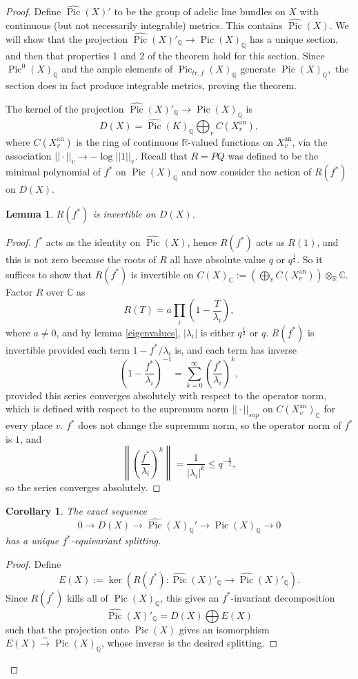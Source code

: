 \documentclass[times, doublespace]{amsart}
\numberwithin{equation}{section}
\theoremstyle{plain}
\newtheorem{lemma}[equation]{Lemma}
\newtheorem{cor}[equation]{Corollary}
\theoremstyle{definition}
\DeclareMathOperator{\Pic}{Pic}
\DeclareMathOperator{\an}{an}
\newcommand{\isom}{\xrightarrow{~\sim~}}
\newcommand{\C}{\mathbb{C}}
\newcommand{\R}{\mathbb{R}}
\newcommand{\Q}{\mathbb{Q}}
\begin{document}
\begin{proof}
Define $\widehat{\Pic}(X)'$ to  be the group of adelic line bundles on $X$ with continuous (but not necessarily integrable) metrics. This contains $\widehat{\Pic}(X)$. We will show that the projection $\widehat{\Pic}(X)'_{\Q}\to\Pic(X)_{\Q}$ has a unique section, and then that properties 1 and 2 of the theorem hold for this section. Since $\Pic^0(X)_{\Q}$ and the ample elements of $\Pic_{tr,f}(X)_{\Q}$ generate $\Pic(X)_{\Q},$ the section does in fact produce integrable metrics, proving the theorem.

The kernel of the projection $\widehat{\Pic}(X)'_{\Q}\to\Pic(X)_{\Q}$ is 
\[ D(X)=\widehat{\Pic}(K)_{\Q}\bigoplus_vC(X_v^{\an}),\]
where $C(X_v^{\an})$ is the ring of continuous $\R$-valued functions on $X_v^{\an}$, via the association $||\cdot||_v\to-\log ||1||_v$. Recall that $R=PQ$ was defined to be the minimal polynomial of $f^*$ on $\Pic(X)_{\Q}$ and now consider the action of $R(f^*)$ on $D(X)$.

\begin{lemma}
$R(f^*)$ is invertible on $D(X)$.
\end{lemma}
\begin{proof}
$f^*$ acts as the identity on $\widehat{\Pic}(X)$, hence $R(f^*)$ acts as $R(1)$, and this is not zero because the roots of $R$ all have absolute value $q$ or $q^{\frac12}$.
So it suffices to show that $R(f^*)$ is invertible on $C(X)_{\C}:=\left(\bigoplus_vC(X_v^{\an})\right)\otimes_{\R}\C$. Factor $R$ over $\C$ as 
\[ R(T)=a\prod_i\left(1-\frac{T}{\lambda_i}\right),\]
where $a\ne0$, and by lemma \ref{eigenvalues}, $|\lambda_i|$ is either $q^{\frac12}$ or $q$. $R(f^*)$ is invertible provided each term $1-f^*/\lambda_i$ is, and each term has inverse
\[ \left(1-\frac{f^*}{\lambda_i}\right)^{-1}=\sum_{k=0}^{\infty}\left(\frac{f^*}{\lambda_i}\right)^k,\]
provided this series converges absolutely with respect to the operator norm, which is defined with respect to the supremum norm $||\cdot||_{sup}$ on $C(X^{\an}_v)_{\C}$ for every place $v$. $f^*$ does not change the supremum norm, so the operator norm of $f^*$ is $1$, and 
\[ \left\lVert\left(\frac{f^*}{\lambda_i}\right)^k\right\lVert=\frac1{|\lambda_i|^k}\le q^{-\frac k2},\]
so the series converges absolutely.
\end{proof}

\begin{cor}
The exact sequence
\[ 0\longrightarrow D(X)\longrightarrow\widehat{\Pic}(X)_{\Q}'\longrightarrow\Pic(X)_{\Q}\longrightarrow0\]
has a unique $f^*$-equivariant splitting.
\end{cor}
\begin{proof}
Define 
\[ E(X):=\ker\left(R(f^*):\widehat{\Pic}(X)'_{\Q}\longrightarrow\widehat{\Pic}(X)'_{\Q}\right).\]
Since $R(f^*)$ kills all of $\Pic(X)_{\Q}$, this gives an $f^*$-invariant decomposition 
\[ \widehat{\Pic}(X)'_{\Q}=D(X)\bigoplus E(X)\]
such that the projection onto $\Pic(X)$ gives an isomorphism $E(X)\isom\Pic(X)_{\Q}$, whose inverse is the desired splitting.


\end{proof}
\end{proof}
\end{document}
